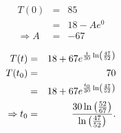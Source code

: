 \begin{frame}

  \begin{eqnarray*}
    T(0) & = & 85 \\
    & = & 18 - A e^{0} \\
    \Rightarrow A & = & -67
  \end{eqnarray*}

  \begin{eqnarray*}
    T(t)  & = & 18 + 67 e^{\frac{t}{30} \ln\left(\frac{47}{52}\right)} \\
    T(t_0)& = & 70 \\
    & = & 18 + 67 e^{\frac{t_0}{30} \ln\left(\frac{47}{52}\right)} \\
    \Rightarrow t_0 & = & \frac{30\ln\left(\frac{52}{67}\right)}{\ln\left(\frac{47}{52}\right)}.
  \end{eqnarray*}

\end{frame}



